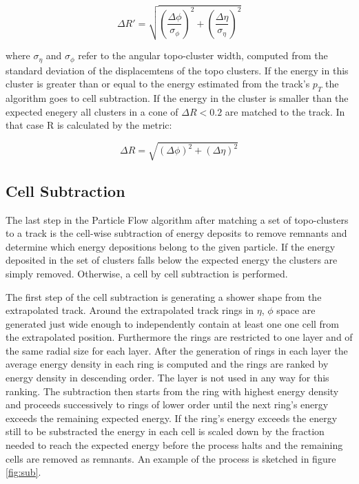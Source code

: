 \begin{equation}
\Delta R' = \sqrt{\left(\frac{\Delta \phi}{\sigma_{\phi}}\right)^2+\left(\frac{\Delta \eta}{\sigma_{\eta}}\right)^2}
\end{equation}

where $\sigma_{\eta}$ and $\sigma_{\phi}$ refer to the angular topo-cluster width, computed from the standard deviation of the displacemtens of the topo clusters. If the energy in this cluster is greater than or equal to the energy estimated from the track's $p_T$ the algorithm goes to cell subtraction. If the energy in the cluster is smaller than the expected enegery all clusters in a cone of $\Delta R < 0.2$ are matched to the track. In that case R is calculated by the metric:

\begin{equation}
\Delta R = \sqrt{(\Delta \phi)^2 + (\Delta \eta)^2}
\end{equation}

\subsection{Cell Subtraction}

The last step in the Particle Flow algorithm after matching a set of topo-clusters to a track is the cell-wise subtraction of energy deposits to remove remnants and determine which energy depositions belong to the given particle.
If the energy deposited in the set of clusters falls below the expected energy the clusters are simply removed. Otherwise, a cell by cell subtraction is performed.

The first step of the cell subtraction is generating a shower shape from the extrapolated track. Around the extrapolated track rings in $\eta$, $\phi$ space are generated just wide enough to independently contain at least one one cell from the extrapolated position. Furthermore the rings are restricted to one layer and of the same radial size for each layer.
After the generation of rings in each layer the average energy density in each ring is computed and the rings are ranked by energy density in descending order. The layer is not used in any way for this ranking.
The subtraction then starts from the ring with highest energy density and proceeds successively to rings of lower order until the next ring's energy exceeds the remaining expected energy.
If the ring's energy exceeds the energy still to be substracted the energy in each cell is scaled down by the fraction needed to reach the expected energy before the process halts and the remaining cells are removed as remnants.
An example of the process is sketched in figure \ref{fig:sub}. 




